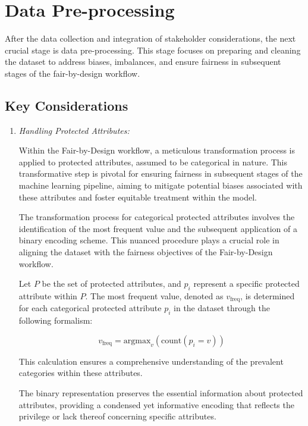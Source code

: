 \documentclass[12pt,a4paper,openright,twoside]{book}
\begin{document}
\section{Data Pre-processing}
\label{section:pre-proc}

After the data collection and integration of stakeholder considerations, the next crucial stage is data pre-processing. This stage focuses on preparing and cleaning the dataset to address biases, imbalances, and ensure fairness in subsequent stages of the fair-by-design workflow.

\subsection{Key Considerations}

\begin{enumerate}

    \item \emph{Handling Protected Attributes:} 
    
    Within the Fair-by-Design workflow, a meticulous transformation process is applied to protected attributes, assumed to be categorical in nature. This transformative step is pivotal for ensuring fairness in subsequent stages of the machine learning pipeline, aiming to mitigate potential biases associated with these attributes and foster equitable treatment within the model.

    The transformation process for categorical protected attributes involves the identification of the most frequent value and the subsequent application of a binary encoding scheme. This nuanced procedure plays a crucial role in aligning the dataset with the fairness objectives of the Fair-by-Design workflow.

    Let $P$ be the set of protected attributes, and $p_i$ represent a specific protected attribute within $P$. The most frequent value, denoted as $v_{\text{freq}}$, is determined for each categorical protected attribute $p_i$ in the dataset through the following formalism:

    \[
    v_{\text{freq}} = \text{argmax}_v \left( \text{count}(p_i = v) \right)
    \]
    
    This calculation ensures a comprehensive understanding of the prevalent categories within these attributes.

    The binary representation preserves the essential information about protected attributes, providing a condensed yet informative encoding that reflects the privilege or lack thereof concerning specific attributes.


\end{enumerate}
\end{document}
